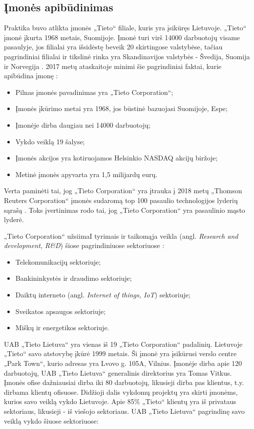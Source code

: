 \documentclass{VUMIFPSbakalaurinis}
\begin{document}
\subsection{Įmonės apibūdinimas}
Praktika buvo atlikta įmonės „Tieto“ filiale, kuris yra įsikūręs Lietuvoje. „Tieto“ įmonė įkurta 1968 metais, Suomijoje. Įmonė turi virš 14000 darbuotojų visame pasaulyje, jos filialai yra išsidėstę beveik 20 skirtingose valstybėse, tačiau pagrindiniai filialai ir tikslinė rinka yra Skandinavijos valstybės - Švedija, Suomija ir Norvegija \cite{TIETO}. 2017 metų ataskaitoje minimi šie pagrindiniai faktai, kurie apibūdina įmonę \cite{TIETO}:
\begin{itemize}
    \item Pilnas įmonės pavadinimas yra „Tieto Corporation“;
    \item Įmonės įkūrimo metai yra 1968, jos būstinė bazuojasi Suomijoje, Espe;
    \item Įmonėje dirba daugiau nei 14000 darbuotojų;
    \item Vykdo veiklą 19 šalyse;
    \item Įmonės akcijos yra kotiruojamos Helsinkio NASDAQ akcijų biržoje;
    \item Metinė įmonės apyvarta yra 1,5 milijardų eurų.
\end{itemize}

Verta paminėti tai, jog  „Tieto Corporation“ yra įtrauka į 2018 metų „Thomson Reuters Corporation“ įmonės sudaromą top 100 pasaulio technologijos lyderių sąrašą \cite{List}. Toks įvertinimas rodo tai, jog „Tieto Corporation“ yra pasaulinio mąsto lyderė.

„Tieto Corporation“ užsiimaI tyrimais ir taikomąja veikla (angl. \textit{Research and development, R&D}) šiose pagrindiniuose sektoriuose \cite{TIETO}:
\begin{itemize}
    \item Telekomunikacijų sektoriuje;
    \item Bankininkystės ir draudimo sektoriuje;
    \item Daiktų interneto (angl. \textit{Internet of things, IoT}) sektoriuje;
    \item Sveikatos apsaugos sektoriuje;
    \item Miškų ir energetikos sektoriuje.
\end{itemize}

UAB „Tieto Lietuva“ yra vienas iš 19 „Tieto Corporation“ padalinių. Lietuvoje „Tieto“ savo atstovybę įkūrė 1999 metais. Ši įmonė yra įsikūrusi verslo centre „Park Town“, kurio adresas yra Lvovo g. 105A, Vilnius. Įmonėje dirba apie 120 darbuotojų, UAB „Tieto Lietuva“ generalinis direktorius yra Tomas Vitkus. Įmonės ofise dažniausiai dirba iki 80 darbuotojų, likusieji dirba pas klientus, t.y. dirbama klientų ofisuose. Didžioji dalis vykdomų projektų yra skirti įmonėms, kurios savo veiklą vykdo Lietuvoje. Apie 85\% „Tieto“ klientų yra iš privataus sektoriaus, likusieji - iš viešojo sektoriaus. UAB „Tieto Lietuva“ pagrindinę savo veiklą vykdo šiuose sektoriuose: 
\end{document}
